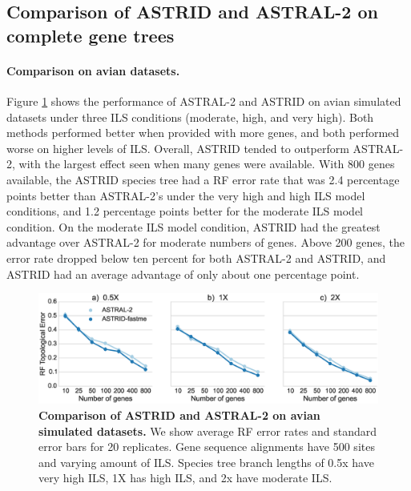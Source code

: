 \subsection{Comparison of ASTRID and ASTRAL-2 
on complete gene trees}

\paragraph{Comparison on avian datasets. }
Figure \ref{astrid::fig:avian-ils} shows the performance of
ASTRAL-2 
 and ASTRID on avian simulated datasets
under three ILS conditions (moderate, high, and very high).
Both methods performed better when provided with more genes, and both
performed worse on higher levels of ILS.
Overall, ASTRID tended to outperform ASTRAL-2, with the
largest effect seen when many genes were available. With 800 genes
available, the ASTRID species tree had a RF error
rate that was 2.4 percentage points better than ASTRAL-2’s under the
very high and high ILS model conditions, and 1.2 percentage points better for
the moderate ILS model condition.
On the moderate ILS model condition, ASTRID had the greatest advantage
over ASTRAL-2 
 for moderate numbers of genes. Above 200 genes, the error
rate dropped below ten percent for both ASTRAL-2 
 and ASTRID, and ASTRID
had an average advantage of only about one percentage point.


\begin{figure}
  \centering
  \includegraphics[width=12cm]{astrid-figs/avian-ils.eps}
  \caption[Comparison of ASTRID and ASTRAL-2 on avian simulated datasets]{\textbf{Comparison of ASTRID and ASTRAL-2 on avian simulated datasets. }
We show average RF error rates and standard error
bars for 20 replicates. Gene sequence alignments  have 500 sites
and
    varying amount of ILS. 
Species tree branch lengths of 0.5x 
    have very high ILS, 1X has high ILS, and 2x have moderate ILS. 
}
  \label{astrid::fig:avian-ils}
\end{figure}


